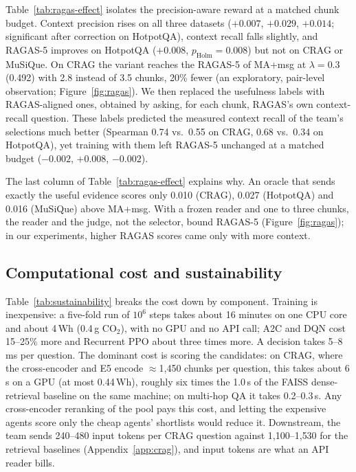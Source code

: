 \documentclass[sigconf,anonymous]{aamas}
\theoremstyle{plain}
\theoremstyle{definition}
\begin{document}
Table~\ref{tab:ragas-effect} isolates the precision-aware reward at a matched chunk budget. Context precision rises on all three datasets ($+0.007$, $+0.029$, $+0.014$; significant after correction on HotpotQA), context recall falls slightly, and RAGAS-5 improves on HotpotQA ($+0.008$, $p_{\mathrm{Holm}}=0.008$) but not on CRAG or MuSiQue. On CRAG the variant reaches the RAGAS-5 of MA+msg at $\lambda=0.3$ (0.492) with 2.8 instead of 3.5 chunks, 20\% fewer (an exploratory, pair-level observation; Figure~\ref{fig:ragas}). We then replaced the usefulness labels with RAGAS-aligned ones, obtained by asking, for each chunk, RAGAS's own context-recall question. These labels predicted the measured context recall of the team's selections much better (Spearman 0.74 vs.\ 0.55 on CRAG, 0.68 vs.\ 0.34 on HotpotQA), yet training with them left RAGAS-5 unchanged at a matched budget ($-0.002$, $+0.008$, $-0.002$).

The last column of Table~\ref{tab:ragas-effect} explains why. An oracle that sends exactly the useful evidence scores only 0.010 (CRAG), 0.027 (HotpotQA) and 0.016 (MuSiQue) above MA+msg. With a frozen reader and one to three chunks, the reader and the judge, not the selector, bound RAGAS-5 (Figure~\ref{fig:ragas}); in our experiments, higher RAGAS scores came only with more context.





\subsection{Computational cost and sustainability}

Table~\ref{tab:sustainability} breaks the cost down by component. Training is inexpensive: a five-fold run of $10^6$ steps takes about 16 minutes on one CPU core and about 4\,Wh (0.4\,g CO$_2$), with no GPU and no API call; A2C and DQN cost 15--25\% more and Recurrent PPO about three times more. A decision takes 5--8\,ms per question. The dominant cost is scoring the candidates: on CRAG, where the cross-encoder and E5 encode $\approx$1{,}450 chunks per question, this takes about 6\,s on a GPU (at most 0.44\,Wh), roughly six times the 1.0\,s of the FAISS dense-retrieval baseline on the same machine; on multi-hop QA it takes 0.2--0.3\,s. Any cross-encoder reranking of the pool pays this cost, and letting the expensive agents score only the cheap agents' shortlists would reduce it. Downstream, the team sends 240--480 input tokens per CRAG question against 1{,}100--1{,}530 for the retrieval baselines (Appendix~\ref{app:crag}), and input tokens are what an API reader bills.
\end{document}

